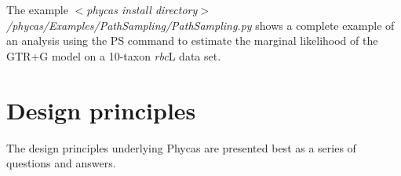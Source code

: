 \documentclass[10pt]{article}
\newcommand{\pathname}[1]{{\em #1}}				%
\begin{document}
The example \pathname{$<$phycas install directory$>$/phycas/Examples/PathSampling/PathSampling.py} shows a complete example of an analysis using the PS command to estimate the marginal likelihood of the GTR+G model on a 10-taxon {\em rbc}L data set.

\section{Design principles}\label{sec:designprinciples}

The design principles underlying Phycas are presented best as a series of questions and answers.

\end{document}
